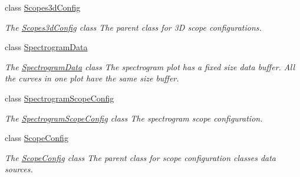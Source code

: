 \begin{DoxyCompactItemize}
\item 
class \hyperlink{class_scopes3d_config}{Scopes3d\-Config}
\begin{DoxyCompactList}\small\item\em The \hyperlink{class_scopes3d_config}{Scopes3d\-Config} class The parent class for 3\-D scope configurations. \end{DoxyCompactList}\item 
class \hyperlink{class_spectrogram_data}{Spectrogram\-Data}
\begin{DoxyCompactList}\small\item\em The \hyperlink{class_spectrogram_data}{Spectrogram\-Data} class The spectrogram plot has a fixed size data buffer. All the curves in one plot have the same size buffer. \end{DoxyCompactList}\item 
class \hyperlink{class_spectrogram_scope_config}{Spectrogram\-Scope\-Config}
\begin{DoxyCompactList}\small\item\em The \hyperlink{class_spectrogram_scope_config}{Spectrogram\-Scope\-Config} class The spectrogram scope configuration. \end{DoxyCompactList}\item 
class \hyperlink{class_scope_config}{Scope\-Config}
\begin{DoxyCompactList}\small\item\em The \hyperlink{class_scope_config}{Scope\-Config} class The parent class for scope configuration classes data sources. \end{DoxyCompactList}\end{DoxyCompactItemize}
